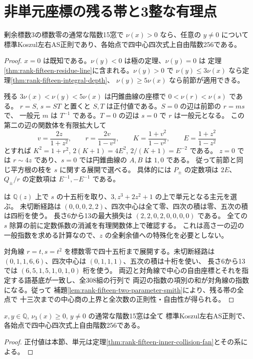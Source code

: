 \section{非単元座標の残る帯と3整な有理点}
\label{sec:rank-fifteen-nonunit-pole-strip}
\begin{theorem}\label{thm:rank-fifteen-nonunit-pole-strip}
剰余標数3の標数零の通常な階数15窓で $\nu(x)>0$ なら、任意の $y\ne0$ について
標準Koszul左右AS正則であり、各始点で四中心四次式上自由階数256である。
\end{theorem}
\begin{proof}
$x=0$ は既知である。$\nu(y)<0$ は極の定理、$\nu(y)=0$ は
定理\ref{thm:rank-fifteen-residue-line}に含まれる。$\nu(y)>0$ で
$\nu(y)\le3\nu(x)$ なら定理\ref{thm:rank-fifteen-integral-depth}、
$\nu(y)\ge5\nu(x)$ なら前節が適用できる。

残る $3\nu(x)<\nu(y)<5\nu(x)$ は円錐曲線の座標で $0<\nu(r)<\nu(s)$ である。
$r=S$, $s=ST$ と置くと $S,T$ は正付値である。$S=0$ の辺は前節の $r=ms$ で、
一般元 $m$ は $T^{-1}$ である。$T=0$ の辺は $s=0$ で $r$ は一般元となる。
この第二の辺の関数体を有限拡大して
\[
 v=\frac{2z}{1+z^2},\qquad r=\frac{2v}{1-v^2},\qquad
 K=\frac{1+v^2}{1-v^2},\qquad E=\frac{1+z^2}{1-z^2}
\]
とすれば $K^2=1+r^2$, $2(K+1)=4E^2$, $2/(K+1)=E^{-2}$ である。
$z=0$ では $r\sim4z$ であり、$s=0$ では円錐曲線の $A,B$ は $1,0$ である。
従って前節と同じ平方根の枝を $s$ に関する展開で選べる。
具体的には $P_\pm$ の定数項は $2E$、$Q_\pm/r$ の定数項は $E^{-1},-E^{-1}$ である。

 は
$\mathbb Q(z)$ 上で $s$ の十五桁を取り、$3,z^3+2z^2+1$ の上で単元となる主元を選ぶ。
未切断経路は $(0,0,0,2,2)$、四次中心は全て零、四次の積は零、五次の積は四桁を使う。
長さ6から13の最大損失は $(2,2,0,2,0,0,0,0)$ である。
全ての $s$ 除算の前に定数係数の消滅を有理関数体上で確認する。
これは高さ一の辺の一般指数を求める計算なので、$z$ の全剰余値への特殊化を必要としない。

対角線 $r=t,s=t^2$ を標数零で四十五桁まで展開する。未切断経路は
$(0,1,1,6,6)$、四次中心は $(0,1,1,1)$、五次の積は十桁を使い、
長さ6から13では $(6,5,1,5,1,0,1,0)$ 桁を使う。
両辺と対角線で中心の自由座標とそれを指定する語基底が一致し、全308組の行列で
両辺の指数の項別の和が対角線の指数になる。従って
補題\ref{lem:rank-fifteen-two-parameter-smith}により、残る帯の全点で
十三次までの中心商の上界と全次数の正則性・自由性が得られる。
\end{proof}

\begin{corollary}
$x,y\in\mathbb Q$, $\nu_3(x)\ge0$, $y\ne0$ の通常な階数15窓は全て
標準Koszul左右AS正則で、各始点で四中心四次式上自由階数256である。
\end{corollary}
\begin{proof}
正付値は本節、単元は定理\ref{thm:rank-fifteen-inner-collision-fan}とその系による。
\end{proof}

